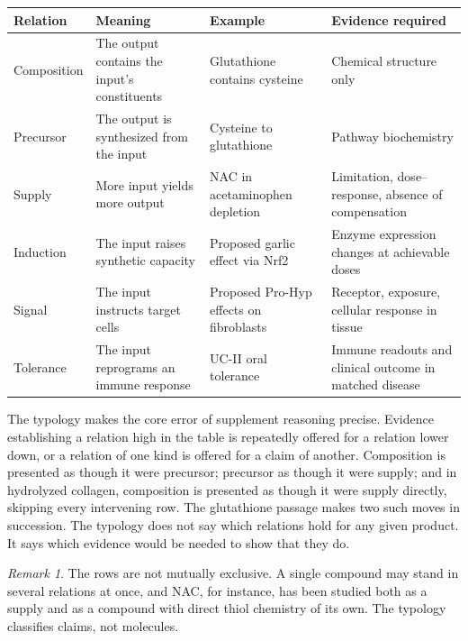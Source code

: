 \documentclass[11pt,a4paper]{article}
\theoremstyle{plain}
\theoremstyle{definition}
\theoremstyle{remark}
\newtheorem{remark}{Remark}
\begin{document}
\begin{center}
\small
\begin{tabularx}{\textwidth}{@{}>{\raggedright\arraybackslash}p{}>{\raggedright\arraybackslash}X>{\raggedright\arraybackslash}p{}>{\raggedright\arraybackslash}X@{}}
\toprule
\textbf{Relation} & \textbf{Meaning} & \textbf{Example} & \textbf{Evidence required} \\
\midrule
Composition & The output contains the input's constituents & Glutathione contains cysteine & Chemical structure only \\
Precursor & The output is synthesized from the input & Cysteine to glutathione & Pathway biochemistry \\
Supply & More input yields more output & NAC in acetaminophen depletion & Limitation, dose--response, absence of compensation \\
Induction & The input raises synthetic capacity & Proposed garlic effect via Nrf2 & Enzyme expression changes at achievable doses \\
Signal & The input instructs target cells & Proposed Pro-Hyp effects on fibroblasts & Receptor, exposure, cellular response in tissue \\
Tolerance & The input reprograms an immune response & UC-II oral tolerance & Immune readouts and clinical outcome in matched disease \\
\bottomrule
\end{tabularx}
\end{center}

The typology makes the core error of supplement reasoning precise. Evidence establishing a relation high in the table is repeatedly offered for a relation lower down, or a relation of one kind is offered for a claim of another. Composition is presented as though it were precursor; precursor as though it were supply; and in hydrolyzed collagen, composition is presented as though it were supply directly, skipping every intervening row. The glutathione passage makes two such moves in succession. The typology does not say which relations hold for any given product. It says which evidence would be needed to show that they do.

\begin{remark}
The rows are not mutually exclusive. A single compound may stand in several relations at once, and NAC, for instance, has been studied both as a supply and as a compound with direct thiol chemistry of its own. The typology classifies claims, not molecules.
\end{remark}
\end{document}
